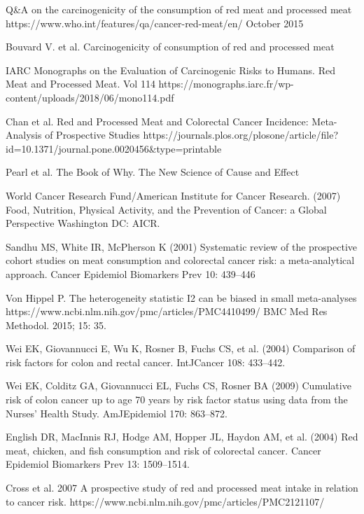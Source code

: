 \documentclass{article}
\begin{document}
\begin{thebibliography}{1}

\newblock Q\&A on the carcinogenicity of the consumption of red meat and processed meat
\newblock https://www.who.int/features/qa/cancer-red-meat/en/
\newblock October 2015

Bouvard V. et al.
\newblock Carcinogenicity of consumption of red and processed meat

IARC Monographs on the Evaluation of Carcinogenic Risks to Humans. Red Meat and Processed Meat. Vol 114
https://monographs.iarc.fr/wp-content/uploads/2018/06/mono114.pdf

Chan et al.
\newblock Red and Processed Meat and Colorectal Cancer Incidence: Meta-Analysis of Prospective Studies
https://journals.plos.org/plosone/article/file?id=10.1371/journal.pone.0020456\&type=printable

Pearl et al.
\newblock The Book of Why. The New Science of Cause and Effect

World Cancer Research Fund/American Institute for Cancer Research. (2007)
Food, Nutrition, Physical Activity, and the Prevention of Cancer: a Global
Perspective Washington DC: AICR.

Sandhu MS, White IR, McPherson K (2001) Systematic review of the
prospective cohort studies on meat consumption and colorectal cancer risk: a
meta-analytical approach. Cancer Epidemiol Biomarkers Prev 10: 439–446

Von Hippel P.
The heterogeneity statistic I2 can be biased in small meta-analyses
https://www.ncbi.nlm.nih.gov/pmc/articles/PMC4410499/
BMC Med Res Methodol. 2015; 15: 35.

Wei EK, Giovannucci E, Wu K, Rosner B, Fuchs CS, et al. (2004) Comparison
of risk factors for colon and rectal cancer. IntJCancer 108: 433–442.

Wei EK, Colditz GA, Giovannucci EL, Fuchs CS, Rosner BA (2009)
Cumulative risk of colon cancer up to age 70 years by risk factor status using
data from the Nurses’ Health Study. AmJEpidemiol 170: 863–872.

English DR, MacInnis RJ, Hodge AM, Hopper JL, Haydon AM, et al. (2004)
Red meat, chicken, and fish consumption and risk of colorectal cancer. Cancer
Epidemiol Biomarkers Prev 13: 1509–1514.

Cross et al. 2007
\newblock A prospective study of red and processed meat intake in relation to cancer risk.
https://www.ncbi.nlm.nih.gov/pmc/articles/PMC2121107/

\end{thebibliography}
\end{document}
